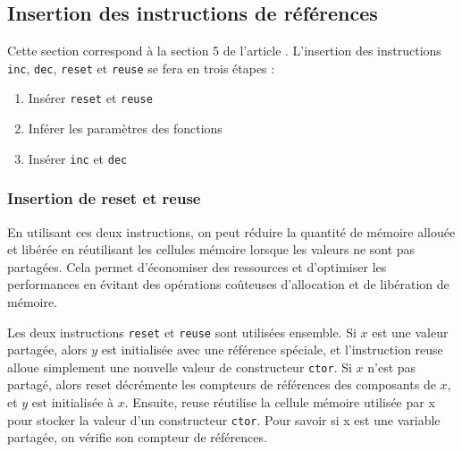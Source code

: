 \documentclass{rapportECL}
\begin{document}
\subsection{Insertion des instructions de références} \label{section:insert_inc_dec}

Cette section correspond à la section 5 de l'article \cite{ullrich_counting_2020}.
L'insertion des instructions \verb|inc|, \verb|dec|, \verb|reset| et \verb|reuse| se fera en trois étapes :
\begin{enumerate}
    \item Insérer \verb|reset| et \verb|reuse|
    \item Inférer les paramètres des fonctions
    \item Insérer \verb|inc| et \verb|dec|
\end{enumerate}

\subsubsection{Insertion de reset et reuse}
En utilisant ces deux instructions, on peut réduire la quantité de mémoire allouée et libérée en réutilisant les cellules mémoire lorsque les valeurs ne sont pas partagées. Cela permet d'économiser des ressources et d'optimiser les performances en évitant des opérations coûteuses d'allocation et de libération de mémoire.

Les deux instructions \verb|reset| et \verb|reuse| sont utilisées ensemble. Si $x$ est une valeur partagée, alors $y$ est initialisée avec une référence spéciale, et l'instruction reuse alloue simplement une nouvelle valeur de constructeur \verb|ctor|. 
Si $x$ n'est pas partagé, alors reset décrémente les compteurs de références des composants de $x$, et $y$ est initialisée à $x$. 
Ensuite, reuse réutilise la cellule mémoire utilisée par x pour stocker la valeur d'un constructeur \verb|ctor|. Pour savoir si x est une variable partagée, on vérifie son compteur de références.
\end{document}
